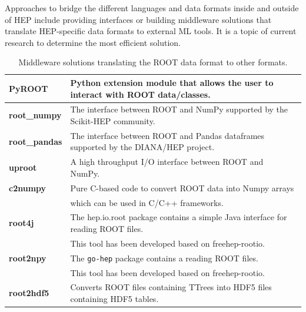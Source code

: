 Approaches to bridge the different languages and data formats inside and outside of HEP include providing interfaces or building middleware solutions that translate HEP-specific data formats to external ML tools. It is a topic of current research to determine the most efficient solution.

\begin{table}[htbp]
 \caption{Middleware solutions translating the ROOT data format to other formats.}
 \begin{center}
  \begin{tabular}{|l|l|}
   \hline
   \textbf{PyROOT}       & Python extension module that allows the user to interact with ROOT data/classes.~\cite{PyROOT}          \\
   \hline
   \textbf{root\_numpy}  & The interface between ROOT and NumPy supported by the Scikit-HEP community.~\cite{root_numpy}           \\
   \hline
   \textbf{root\_pandas} & The interface between ROOT and Pandas dataframes supported by the DIANA/HEP project.~\cite{root_pandas} \\
   \hline
   \textbf{uproot}       & A high throughput I/O interface between ROOT and NumPy.~\cite{uproot}                                   \\
   \hline
   \textbf{c2numpy}      & Pure C-based code to convert ROOT data into Numpy arrays                                                \\
                         & which can be used in C/C++ frameworks.~\cite{c2numpy}                                                   \\
   \hline

   \textbf{root4j}       & The hep.io.root package contains a simple Java interface for reading ROOT files.                        \\
                         & This tool has been developed based on freehep-rootio.~\cite{root4j}                                     \\
   \hline

   \textbf{root2npy}     & The \texttt{go-hep} package contains a reading ROOT files.                                              \\
                         & This tool has been developed based on freehep-rootio.~\cite{root4j}                                     \\
   \hline

   \textbf{root2hdf5}    & Converts ROOT files containing TTrees into HDF5 files containing HDF5 tables.~\cite{root2hdf5}          \\
   \hline
  \end{tabular}
 \end{center}
 \label{table:Middleware}
\end{table}

